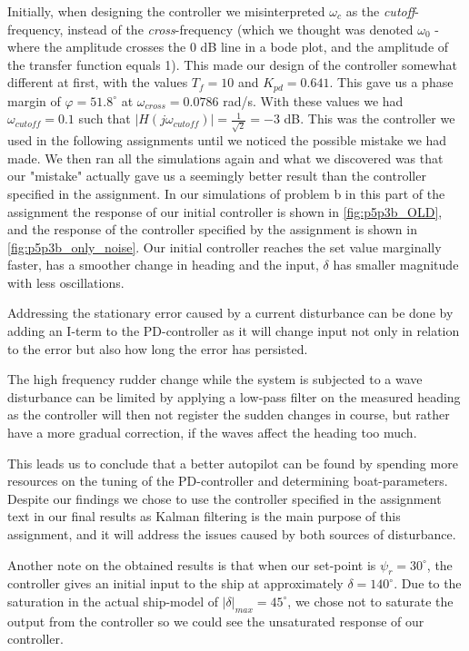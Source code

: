 Initially, when designing the controller we misinterpreted $\omega_c$ as the \textit{cutoff}-frequency, instead of the \textit{cross}-frequency (which we thought was denoted $\omega_0$ - where the amplitude crosses the 0 dB line in a bode plot, and the amplitude of the transfer function equals 1). This made our design of the controller somewhat different at first, with the values $T_f = 10$ and $K_{pd} = 0.641$. This gave us a phase margin of $\varphi = 51.8^\circ$ at $\omega_{cross} = 0.0786$ rad/s. With these values we had $\omega_{cutoff} = 0.1$ such that $|H(j \omega_{cutoff})| = \frac{1}{\sqrt{2}} = -3$ dB. This was the controller we used in the following assignments until we noticed the possible mistake we had made. We then ran all the simulations again and what we discovered was that our "mistake" actually gave us a seemingly better result than the controller specified in the assignment. In our simulations of problem b in this part of the assignment the response of our initial controller is shown in \cref{fig:p5p3b_OLD}, and the response of the controller specified by the assignment is shown in \cref{fig:p5p3b_only_noise}. Our initial controller reaches the set value marginally faster, has a smoother change in heading and the input, $\delta$ has smaller magnitude with less oscillations. 

Addressing the stationary error caused by a current disturbance can be done by adding an I-term to the PD-controller as it will change input not only in relation to the error but also how long the error has persisted.

The high frequency rudder change while the system is subjected to a wave disturbance can be limited by applying a low-pass filter on the measured heading as the controller will then not register the sudden changes in course, but rather have a more gradual correction, if the waves affect the heading too much.


This leads us to conclude that a better autopilot can be found by spending more resources on the tuning of the PD-controller and determining boat-parameters. Despite our findings we chose to use the controller specified in the assignment text in our final results as Kalman filtering is the main purpose of this assignment, and it will address the issues caused by both sources of disturbance.


Another note on the obtained results is that when our set-point is $\psi_r = 30^\circ$, the controller gives an initial input to the ship at approximately $\delta = 140^\circ$. Due to the saturation in the actual ship-model of $|\delta|_{max} = 45^\circ$, we chose not to saturate the output from the controller so we could see the unsaturated response of our controller.


